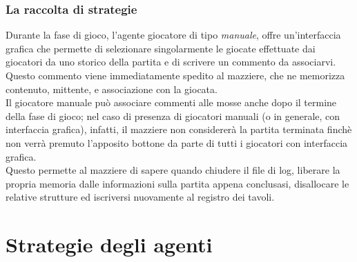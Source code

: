 \documentclass[runningheads,a4paper]{llncs}
\begin{document}
\subsubsection{La raccolta di strategie}
Durante la fase di gioco, l'agente giocatore di tipo \emph{manuale}, offre un'interfaccia grafica che permette di selezionare singolarmente le giocate effettuate dai giocatori da uno storico della partita e di scrivere un commento da associarvi.
Questo commento viene immediatamente spedito al mazziere, che ne memorizza contenuto, mittente, e associazione con la giocata.\\
Il giocatore manuale può associare commenti alle mosse anche dopo il termine della fase di gioco; nel caso di presenza di giocatori manuali (o in generale, con interfaccia grafica), infatti, il mazziere non considererà la partita terminata finchè non verrà premuto l'apposito bottone da parte di tutti i giocatori con interfaccia grafica.\\
Questo permette al mazziere di sapere quando chiudere il file di log, liberare la propria memoria dalle informazioni sulla partita appena conclusasi, disallocare le relative strutture ed iscriversi nuovamente al registro dei tavoli.





\section{Strategie degli agenti}
\end{document}
